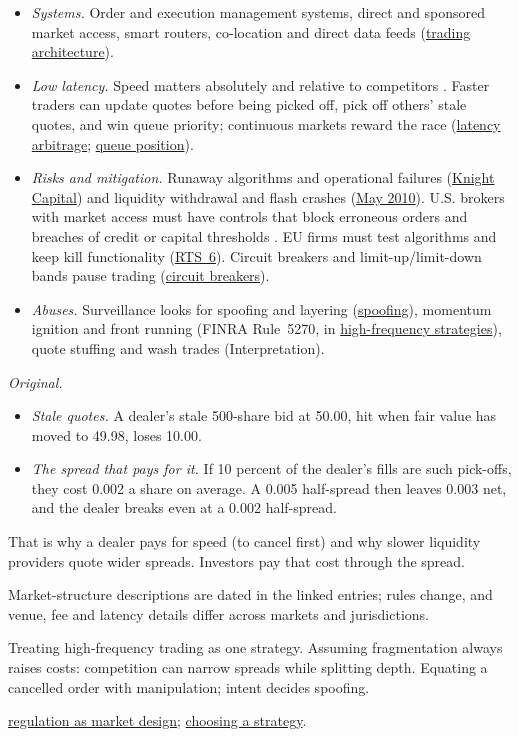 \begin{qfdefinition}
\begin{itemize}
\item \emph{Systems.} Order and execution management systems, direct and sponsored market access, smart routers, co-location and direct data feeds (\hyperref[def:automated-trading-architecture]{trading architecture}).
\item \emph{Low latency.} Speed matters absolutely and relative to competitors \citep[sec.~IV.B.2, pp.~57--58]{sec-concept-release-2010}. Faster traders can update quotes before being picked off, pick off others' stale quotes, and win queue priority; continuous markets reward the race (\hyperref[res:latency-arbitrage-arms-race]{latency arbitrage}; \hyperref[res:queue-position-value]{queue position}).
\item \emph{Risks and mitigation.} Runaway algorithms and operational failures (\hyperref[ev:quant-implementation-failures]{Knight Capital}) and liquidity withdrawal and flash crashes (\hyperref[ev:may-2010-flash-crash]{May 2010}). U.S. brokers with market access must have controls that block erroneous orders and breaches of credit or capital thresholds \citep[17 CFR 240.15c3-5(b)]{cfr-240-15c3-5}. EU firms must test algorithms and keep kill functionality (\hyperref[rule:mifid-rts6-algorithmic-controls]{RTS~6}). Circuit breakers and limit-up/limit-down bands pause trading (\hyperref[mech:circuit-breakers-trading-halts]{circuit breakers}).
\item \emph{Abuses.} Surveillance looks for spoofing and layering (\hyperref[rule:spoofing-securities-markets]{spoofing}), momentum ignition and front running (FINRA Rule~5270, in \hyperref[def:hft-strategies]{high-frequency strategies}), quote stuffing and wash trades (Interpretation).
\end{itemize}

 \emph{Original.}
\begin{itemize}
\item \emph{Stale quotes.} A dealer's stale 500-share bid at 50.00, hit when fair value has moved to 49.98, loses 10.00.
\item \emph{The spread that pays for it.} If 10 percent of the dealer's fills are such pick-offs, they cost 0.002 a share on average. A 0.005 half-spread then leaves 0.003 net, and the dealer breaks even at a 0.002 half-spread.
\end{itemize}
That is why a dealer pays for speed (to cancel first) and why slower liquidity providers quote wider spreads. Investors pay that cost through the spread.

 Market-structure descriptions are dated in the linked entries; rules change, and venue, fee and latency details differ across markets and jurisdictions.

 Treating high-frequency trading as one strategy. Assuming fragmentation always raises costs: competition can narrow spreads while splitting depth. Equating a cancelled order with manipulation; intent decides spoofing.

 \hyperref[def:market-regulation-design]{regulation as market design}; \hyperref[meth:trade-strategy-selection]{choosing a strategy}.

\end{qfdefinition}
